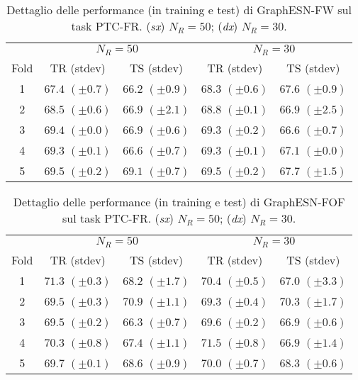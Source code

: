 \begin{table}[tbph]
\footnotesize
\caption[Dettaglio performance: GraphESN-FW su PTC-FR]{Dettaglio delle performance (in training e test) di GraphESN-FW sul task PTC-FR. (\emph{sx}) $N_R=50$; (\emph{dx}) $N_R=30$.}
\label{app:esp:PTC-FR-FW}
\centering
\begin{tabular}{c*{4}{c}}
\toprule
& \multicolumn{2}{c}{$N_R=50$} & \multicolumn{2}{c}{$N_R=30$}\\
Fold & TR (stdev) & TS (stdev) & TR (stdev) & TS (stdev)\\
\midrule
1 & $67.4$ $(\pm 0.7)$ & $66.2$ $(\pm 0.9)$ & $68.3$ $(\pm 0.6)$ & $67.6$ $(\pm 0.9)$\\
2 & $68.5$ $(\pm 0.6)$ & $66.9$ $(\pm 2.1)$ & $68.8$ $(\pm 0.1)$ & $66.9$ $(\pm 2.5)$\\
3 & $69.4$ $(\pm 0.0)$ & $66.9$ $(\pm 0.6)$ & $69.3$ $(\pm 0.2)$ & $66.6$ $(\pm 0.7)$\\
4 & $69.3$ $(\pm 0.1)$ & $66.6$ $(\pm 0.7)$ & $69.3$ $(\pm 0.1)$ & $67.1$ $(\pm 0.0)$\\
5 & $69.5$ $(\pm 0.2)$ & $69.1$ $(\pm 0.7)$ & $69.5$ $(\pm 0.2)$ & $67.7$ $(\pm 1.5)$\\
\bottomrule
\end{tabular}
\end{table}



\begin{table}[tbph]
\footnotesize
\caption[Dettaglio performance: GraphESN-FOF su PTC-FR]{Dettaglio delle performance (in training e test) di GraphESN-FOF sul task PTC-FR. (\emph{sx}) $N_R=50$; (\emph{dx}) $N_R=30$.}
\label{app:esp:PTC-FR-FOF}
\centering
\begin{tabular}{c*{4}{c}}
\toprule
& \multicolumn{2}{c}{$N_R=50$} & \multicolumn{2}{c}{$N_R=30$}\\
Fold & TR (stdev) & TS (stdev) & TR (stdev) & TS (stdev)\\
\midrule
1 & $71.3$ $(\pm 0.3)$ & $68.2$ $(\pm 1.7)$ & $70.4$ $(\pm 0.5)$ & $67.0$ $(\pm 3.3)$\\
2 & $69.5$ $(\pm 0.3)$ & $70.9$ $(\pm 1.1)$ & $69.3$ $(\pm 0.4)$ & $70.3$ $(\pm 1.7)$\\
3 & $69.5$ $(\pm 0.2)$ & $66.3$ $(\pm 0.7)$ & $69.6$ $(\pm 0.2)$ & $66.9$ $(\pm 0.6)$\\
4 & $70.3$ $(\pm 0.8)$ & $67.4$ $(\pm 1.1)$ & $71.5$ $(\pm 0.8)$ & $66.9$ $(\pm 1.4)$\\
5 & $69.7$ $(\pm 0.1)$ & $68.6$ $(\pm 0.9)$ & $70.0$ $(\pm 0.7)$ & $68.3$ $(\pm 0.6)$\\
\bottomrule
\end{tabular}
\end{table}

